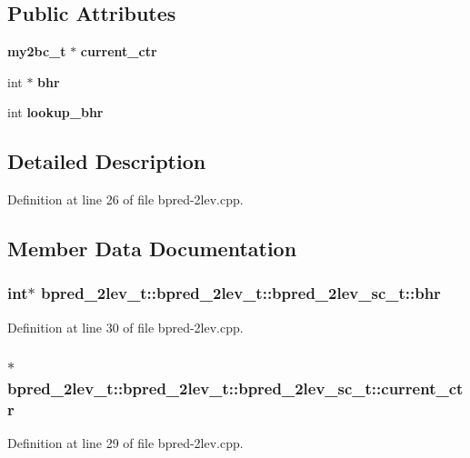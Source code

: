 \subsection*{Public Attributes}
\begin{CompactItemize}
\item 
{\bf my2bc\_\-t} $\ast$ {\bf current\_\-ctr}
\item 
int $\ast$ {\bf bhr}
\item 
int {\bf lookup\_\-bhr}
\end{CompactItemize}


\subsection{Detailed Description}


Definition at line 26 of file bpred-2lev.cpp.

\subsection{Member Data Documentation}
\subsubsection[{bhr}]{\setlength{\rightskip}{0pt plus 5cm}int$\ast$ bpred\_\-2lev\_\-t::bpred\_\-2lev\_\-t::bpred\_\-2lev\_\-sc\_\-t::bhr}\label{classbpred__2lev__t_1_1bpred__2lev__sc__t_6f40b9b7a7d2c5b6a309f225e350cb6d}




Definition at line 30 of file bpred-2lev.cpp.
\subsubsection[{current\_\-ctr}]{$\ast$ bpred\_\-2lev\_\-t::bpred\_\-2lev\_\-t::bpred\_\-2lev\_\-sc\_\-t::current\_\-ctr}\label{classbpred__2lev__t_1_1bpred__2lev__sc__t_d5b93b7f3e2d730ed9ea5c1280fac017}




Definition at line 29 of file bpred-2lev.cpp.
